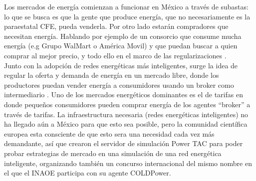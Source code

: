 Los mercados de energía comienzan a funcionar en México a través de subastas: lo que se busca es que la gente que produce energía, que no necesariamente es la paraestatal CFE, pueda venderla. Por otro lado estarán compradores  que necesitan energía. Hablando por ejemplo de un consorcio que consume mucha energía (e.g Grupo WalMart o América Movil) y que puedan buscar a quien comprar al mejor precio, y todo ello en el marco de las regularizaciones \cite{GRiveraProyectoDeIADelInaoe}.\\

Junto con la adopción de redes energéticas más inteligentes, surge la idea de regular la oferta y demanda de energía en un mercado libre, donde los productores puedan vender energía a consumidores usando un broker como intermediario \cite{Fixed-priceTariffG2015}. 
Uno de los mercados energéticos dominantes es el de tarifas en donde pequeños consumidores pueden comprar energía de los agentes ``broker'' a través de tarifas.
La infraestructura necesaria (redes energéticas inteligentes) no ha llegado aún a México para que esto sea posible, pero la comunidad científica europea esta consciente de que esto sera una necesidad cada vez más demandante, así que crearon el servidor de simulación Power TAC para poder probar estrategias de mercado en una simulación de una red energética inteligente, organizando también un concurso internacional del mismo nombre en el que el INAOE participa con su agente COLDPower.
